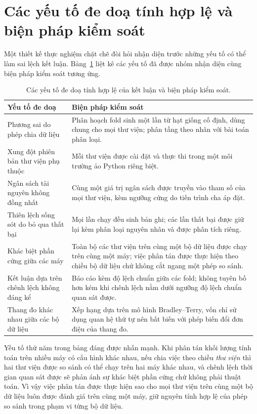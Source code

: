 \section{Các yếu tố đe doạ tính hợp lệ và biện pháp kiểm soát}
\label{sec:hopleimuc}
Một thiết kế thực nghiệm chặt chẽ đòi hỏi nhận diện trước những yếu tố có thể làm
sai lệch kết luận. Bảng~\ref{tab:threats} liệt kê các yếu tố đã được nhóm nhận
diện cùng biện pháp kiểm soát tương ứng.

\begin{table}[H]
  \centering
  \small
  \caption{Các yếu tố đe doạ tính hợp lệ của kết luận và biện pháp kiểm soát.}
  \label{tab:threats}
  \renewcommand{\arraystretch}{1.25}
  \begin{tabularx}{\linewidth}{@{}>{\raggedright\arraybackslash}p{4.2cm} X@{}}
    \toprule
    \textbf{Yếu tố đe doạ} & \textbf{Biện pháp kiểm soát} \\
    \midrule
    Phương sai do phép chia dữ liệu &
    Phân hoạch fold sinh một lần từ hạt giống cố định, dùng chung cho mọi thư
    viện; phân tầng theo nhãn với bài toán phân loại. \\
    Xung đột phiên bản thư viện phụ thuộc &
    Mỗi thư viện được cài đặt và thực thi trong một môi trường ảo Python riêng
    biệt. \\
    Ngân sách tài nguyên không đồng nhất &
    Cùng một giá trị ngân sách được truyền vào tham số của mọi thư viện, kèm
    ngưỡng cứng do tiến trình cha áp đặt. \\
    Thiên lệch sống sót do bỏ qua thất bại &
    Mọi lần chạy đều sinh bản ghi; các lần thất bại được giữ lại kèm phân loại
    nguyên nhân và được phân tích riêng. \\
    Khác biệt phần cứng giữa các máy &
    Toàn bộ các thư viện trên cùng một bộ dữ liệu được chạy trên cùng một máy;
    việc phân tán được thực hiện theo chiều bộ dữ liệu chứ không cắt ngang một
    phép so sánh. \\
    Kết luận dựa trên chênh lệch không đáng kể &
    Báo cáo kèm độ lệch chuẩn giữa các fold; không tuyên bố hơn kém khi chênh
    lệch nằm dưới ngưỡng độ lệch chuẩn quan sát được. \\
    Thang đo khác nhau giữa các bộ dữ liệu &
    Xếp hạng dựa trên mô hình Bradley--Terry, vốn chỉ sử dụng quan hệ thứ tự nên
    bất biến với phép biến đổi đơn điệu của thang đo. \\
    \bottomrule
  \end{tabularx}
\end{table}

Yếu tố thứ năm trong bảng đáng được nhấn mạnh. Khi phân tán khối lượng tính toán
trên nhiều máy có cấu hình khác nhau, nếu chia việc theo chiều \emph{thư viện} thì
hai thư viện được so sánh có thể chạy trên hai máy khác nhau, và chênh lệch thời
gian quan sát được sẽ phản ánh sự khác biệt phần cứng chứ không phải thuật toán.
Vì vậy việc phân tán được thực hiện sao cho mọi thư viện trên cùng một bộ dữ liệu
luôn được đánh giá trên cùng một máy, giữ nguyên tính hợp lệ của phép so sánh
trong phạm vi từng bộ dữ liệu.
